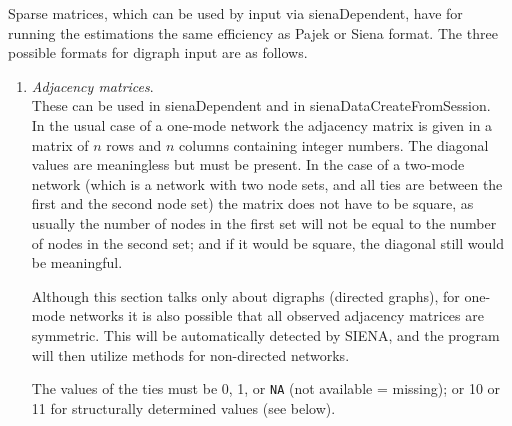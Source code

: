 \documentclass[a4paper,fleqn,11pt]{article}
\newcommand{\+}{\, + \,}
\newcommand{\sfn}[1]{\textsf{#1}}
\newcommand{\si}{{\sf SIENA}}
\newcommand{\sn}{{\sf StOCNET}}
\begin{document}
Sparse matrices, which can be used by input via
\sfn{sienaDependent}, have for running the estimations
the same efficiency as Pajek or Siena format.
The three possible formats for digraph input are as follows.
\begin{enumerate}
\item \emph{Adjacency matrices}.\\
      These can be used in  \textsf{sienaDependent} and in
      \sfn{sienaDataCreateFromSession}.\\
      In the usual case of a one-mode network the adjacency matrix
      is given in a matrix of $n$ rows and $n$ columns
      containing integer numbers.
      The diagonal values are meaningless but must be present.
      In the case of a two-mode network (which is a network with two
      node sets, and all ties are between the first and the second node set)
      the matrix does not have to be
      square, as usually the number of nodes in the first set will not be
      equal to the number of nodes in the second set;
      and if it would be square, the diagonal still would be meaningful.

      Although this section talks only about digraphs (directed graphs),
      for one-mode networks it is
      also possible that all observed adjacency matrices are symmetric.
      This will be automatically detected by \si, and
      the program will then utilize methods for non-directed networks.

      The values of the ties must be 0, 1, or \texttt{NA}
      (not available = missing);
      or 10 or 11 for structurally determined values (see below).


\end{enumerate}
\end{document}
